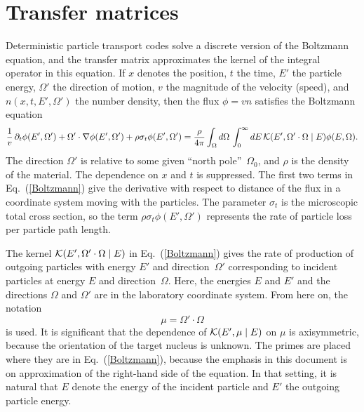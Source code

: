 \chapter{Transfer matrices}
\label{Sec:transfer}
Deterministic particle transport codes solve a
discrete version of the Boltzmann equation, and the
transfer matrix approximates the kernel of the integral
operator in this equation.
If $x$ denotes the position,
$t$ the time, $E'$ the particle energy, $\Omega'$ the
direction of motion, $v$ the magnitude of the velocity (speed), and
$n(x, t, E', \Omega')$ the number density, then the
flux $\phi = vn$ satisfies the Boltzmann 
equation~\cite{Lewis}
\begin{equation}
  \frac{1}{v} \, \partial_t \phi(E', \Omega') +
  \Omega'\cdot \nabla \phi(E', \Omega') +
      \rho\sigma_t \phi(E', \Omega') =
  \frac{\rho}{4\pi}
   \int_{\Omega} d\Omega \, \int_0^\infty dE \, 
      {\cal K}(E', \Omega' \cdot \Omega \mid E) \phi(E, \Omega).
  \label{Boltzmann}
\end{equation}
The direction $\Omega'$ is relative to some given 
``north pole''~$\Omega_0$, and $\rho$ is the density of the material.
The dependence on $x$ and $t$ is suppressed.
The first two terms in Eq.~(\ref{Boltzmann}) give the derivative 
with respect to distance of
the flux in a coordinate system moving with the particles.
The parameter
$\sigma_t$ is the microscopic total cross section, so the term
$\rho\sigma_t \phi(E', \Omega')$ represents the rate of particle loss
per particle path length.

The kernel
${\cal K}(E', \Omega' \cdot \Omega \mid E)$ in Eq.~(\ref{Boltzmann}) gives the
rate of production of outgoing particles with energy $E'$ and 
direction~$\Omega'$ corresponding to incident particles
at energy $E$ and direction~$\Omega$.
Here, the energies $E$ and $E'$ and the directions $\Omega$
and $\Omega'$ are in the laboratory coordinate system.
From here on,  the notation
$$
  \mu = \Omega' \cdot \Omega
$$
is used.
It is significant that the dependence of
${\cal K}(E', \mu \mid E)$ on $\mu$
is axisymmetric, because the orientation of the
target nucleus is unknown.  The primes are placed where they are in
Eq.~(\ref{Boltzmann}), because the emphasis in this document is on
approximation of the right-hand side of the equation.  In that setting, it is
natural that $E$ denote the energy of the incident particle and $E'$
the outgoing particle energy.

